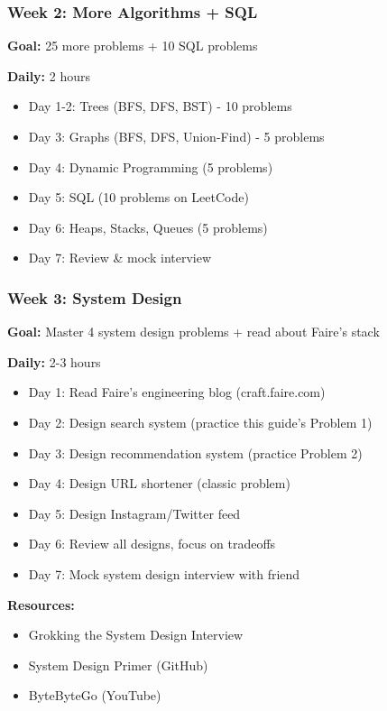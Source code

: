 \documentclass[11pt,letterpaper]{article}
\begin{document}
\subsubsection{Week 2: More Algorithms + SQL}

\textbf{Goal:} 25 more problems + 10 SQL problems

\textbf{Daily:} 2 hours
\begin{itemize}
    \item Day 1-2: Trees (BFS, DFS, BST) - 10 problems
    \item Day 3: Graphs (BFS, DFS, Union-Find) - 5 problems
    \item Day 4: Dynamic Programming (5 problems)
    \item Day 5: SQL (10 problems on LeetCode)
    \item Day 6: Heaps, Stacks, Queues (5 problems)
    \item Day 7: Review \& mock interview
\end{itemize}

\subsubsection{Week 3: System Design}

\textbf{Goal:} Master 4 system design problems + read about Faire's stack

\textbf{Daily:} 2-3 hours
\begin{itemize}
    \item Day 1: Read Faire's engineering blog (craft.faire.com)
    \item Day 2: Design search system (practice this guide's Problem 1)
    \item Day 3: Design recommendation system (practice Problem 2)
    \item Day 4: Design URL shortener (classic problem)
    \item Day 5: Design Instagram/Twitter feed
    \item Day 6: Review all designs, focus on tradeoffs
    \item Day 7: Mock system design interview with friend
\end{itemize}

\textbf{Resources:}
\begin{itemize}
    \item Grokking the System Design Interview
    \item System Design Primer (GitHub)
    \item ByteByteGo (YouTube)
\end{itemize}
\end{document}
